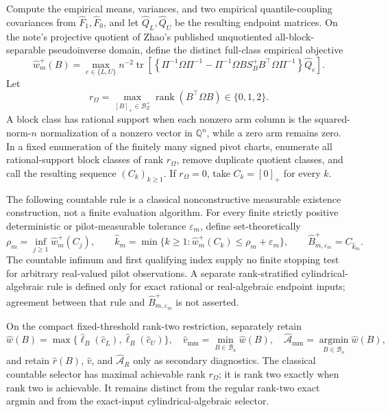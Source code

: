 Compute the empirical means, variances, and two empirical quantile-coupling covariances from \(\widehat F_1,\widehat F_0\), and let \(\widehat Q_L,\widehat Q_U\) be the resulting endpoint matrices.  On the note's projective quotient of Zhao's published unquotiented all-block-separable pseudoinverse domain, define the distinct full-class empirical objective
\[
\widehat w_m^+(B)=
\max_{e\in\{L,U\}}n^{-2}\operatorname{tr}\!\left[
\left\{\Pi^{-1}\Omega\Pi^{-1}
-\Pi^{-1}\Omega B S_B^+B^{\top}\Omega\Pi^{-1}\right\}\widehat Q_e
\right].
\]
Let
\[
r_\Omega=\max_{[B]_+\in\mathcal B_Z^+}\operatorname{rank}(B^{\top}\Omega B)\in\{0,1,2\}.
\]
A block class has rational support when each nonzero arm column is the squared-norm-\(n\) normalization of a nonzero vector in \(\mathbb Q^n\), while a zero arm remains zero.  In a fixed enumeration of the finitely many signed pivot charts, enumerate all rational-support block classes of rank \(r_\Omega\), remove duplicate quotient classes, and call the resulting sequence \((C_k)_{k\ge1}\).  If \(r_\Omega=0\), take \(C_k=[0]_+\) for every \(k\).

The following countable rule is a classical nonconstructive measurable existence construction, not a finite evaluation algorithm.  For every finite strictly positive deterministic or pilot-measurable tolerance \(\varepsilon_m\), define set-theoretically
\[
 \rho_m=\inf_{j\ge1}\widehat w_m^+(C_j),
 \qquad
 \widehat k_m=
 \min\{k\ge1:\widehat w_m^+(C_k)\le\rho_m+\varepsilon_m\},
 \qquad
 \widehat B_{m,\varepsilon_m}^+=C_{\widehat k_m}.
\]
The countable infimum and first qualifying index supply no finite stopping test for arbitrary real-valued pilot observations.  A separate rank-stratified cylindrical-algebraic rule is defined only for exact rational or real-algebraic endpoint inputs; agreement between that rule and \(\widehat B_{m,\varepsilon_m}^+\) is not asserted.

On the compact fixed-threshold rank-two restriction, separately retain
\[
\widehat w(B)=\max\{\widehat\ell_B(\widehat c_L),\widehat\ell_B(\widehat c_U)\},
\quad
\widehat v_{\mathrm{mm}}=\min_{B\in\mathcal B_\kappa}\widehat w(B),
\quad
\widehat{\mathcal A}_{\mathrm{mm}}=\operatorname*{argmin}_{B\in\mathcal B_\kappa}\widehat w(B),
\]
and retain \(\widehat r(B)\), \(\widehat v\), and \(\widehat{\mathcal A}_R\) only as secondary diagnostics.  The classical countable selector has maximal achievable rank \(r_\Omega\); it is rank two exactly when rank two is achievable.  It remains distinct from the regular rank-two exact argmin and from the exact-input cylindrical-algebraic selector.